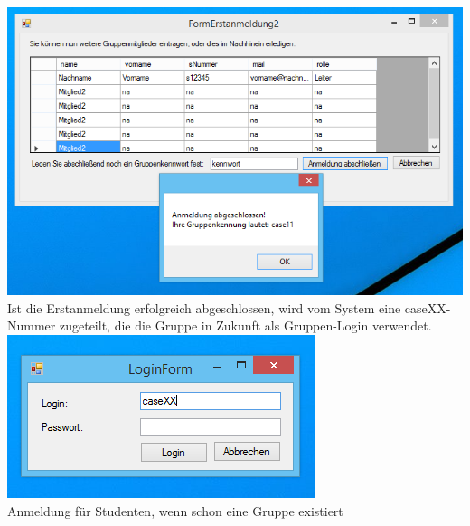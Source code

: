 \documentclass{article}
\begin{document}
\begin{center}
    \includegraphics[scale=0.8]{bilder/pic7.PNG}\\
    Ist die Erstanmeldung erfolgreich abgeschlossen, wird vom System eine caseXX-Nummer zugeteilt, die die Gruppe in Zukunft als Gruppen-Login verwendet. \\
    
    \includegraphics{bilder/pic2.PNG}\\
    Anmeldung für Studenten, wenn schon eine Gruppe existiert \\
\end{center}
\newpage
\end{document}

